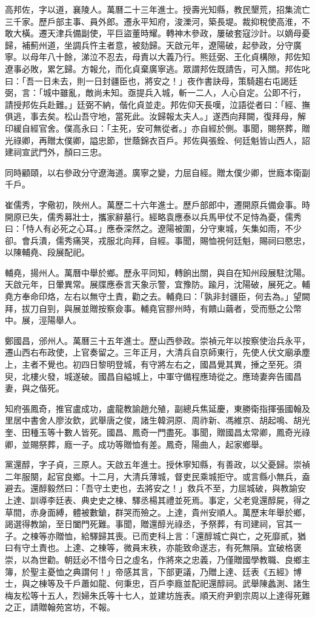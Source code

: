 \begin{pinyinscope}
高邦佐，字以道，襄陵人。萬曆二十三年進士。授壽光知縣，教民墾荒，招集流亡三千家。歷戶部主事、員外郎。遷永平知府，浚濼河，築長堤。裁抑稅使高淮，不敢大橫。遷天津兵備副使，平巨盜董時耀。轉神木參政，屢破套寇沙計。以嫡母憂歸，補薊州道，坐調兵忤主者意，被劾歸。天啟元年，遼陽破，起參政，分守廣寧。以母年八十餘，涕泣不忍去，母責以大義乃行。熊廷弼、王化貞構隙，邦佐知遼事必敗，累乞歸。方報允，而化貞棄廣寧逃。眾謂邦佐既請告，可入關。邦佐叱曰：「吾一日未去，則一日封疆臣也，將安之！」夜作書訣母，策騎趨右屯謁廷弼，言：「城中雖亂，敵尚未知。亟提兵入城，斬一二人，人心自定。公即不行，請授邦佐兵赴難。」廷弼不納，偕化貞並走。邦佐仰天長嘆，泣語從者曰：「經、撫俱逃，事去矣。松山吾守地，當死此。汝歸報太夫人。」遂西向拜闕，復拜母，解印緩自經官舍。僕高永曰：「主死，安可無從者。」亦自經於側。事聞，賜祭葬，贈光祿卿，再贈太僕卿，謚忠節，世蔭錦衣百戶。邦佐與張銓、何廷魁皆山西人，詔建祠宣武門外，顏曰三忠。

同時顧頤，以右參政分守遼海道。廣寧之變，力屈自經。贈太僕少卿，世廕本衛副千戶。

崔儒秀，字儆初，陜州人。萬歷二十六年進士。歷戶部郎中，遷開原兵備僉事。時開原已失，儒秀募壯士，攜家辭墓行。經略袁應泰以兵馬甲仗不足恃為憂，儒秀曰：「恃人有必死之心耳。」應泰深然之。遼陽被圍，分守東城，矢集如雨，不少卻。會兵潰，儒秀痛哭，戎服北向拜，自經。事聞，賜恤視何廷魁，賜祠曰愍忠，以陳輔堯、段展配祀。

輔堯，揚州人。萬曆中舉於鄉。歷永平同知，轉餉出關，與自在知州段展駐沈陽。天啟元年，日暈異常。展牒應泰言天象示警，宜豫防。踰月，沈陽破，展死之。輔堯方奉命印烙，左右以無守土責，勸之去。輔堯曰：「孰非封疆臣，何去為。」望闕拜，拔刀自剄，與展並贈按察僉事。輔堯官膠州時，有饋山繭者，受而懸之公幣中。展，涇陽舉人。

鄭國昌，邠州人。萬曆三十五年進士。歷山西參政。崇禎元年以按察使治兵永平，遷山西右布政使，上官奏留之。三年正月，大清兵自京師東行，先使人伏文廟承塵上，主者不覺也。初四日黎明登城，有守將左右之，國昌覺其異，捶之至死。須臾，北樓火發，城遂破。國昌自縊城上，中軍守備程應琦從之。應琦妻奔告國昌妻，與之偕死。

知府張鳳奇，推官盧成功，盧龍教諭趙允殖，副總兵焦延慶，東勝衛指揮張國翰及里居中書舍人廖汝欽，武舉唐之俊，諸生韓洞原、周祚新、馮維京、胡起鳴、胡光奎、田種玉等十數人皆死。國昌、鳳奇一門盡死。事聞，贈國昌太常卿，鳳奇光祿卿，並賜祭葬，廕一子。成功等贈恤有差。鳳奇，陽曲人，起家鄉舉。

黨還醇，字子貞，三原人。天啟五年進士。授休寧知縣，有善政，以父憂歸。崇禎二年服闋，起官良鄉。十二月，大清兵薄城，督吏民乘城拒守。或言縣小無兵，盍避去。還醇毅然曰：「吾守土吏也，去將安之！」救兵不至，力屈城破，與教諭安上達、訓導李廷表、典史史之棟、驛丞楊其禮並死焉。事定，父老覓還醇屍，得之草間，赤身面縛，體被數鎗，群哭而殮之。上達，貴州安順人。萬歷末年舉於鄉，謁選得教諭，至日闔門死難。事聞，贈還醇光祿丞，予祭葬，有司建祠，官其一子。之棟等亦贈恤，給驛歸其喪。已而吏科上言：「還醇城亡與亡，之死靡貳，猶曰有守土責也。上達、之棟等，微員末秩，亦能致命遂志，有死無隕。宜破格褒崇，以為世勸。朝廷必不惜今日之虛名，作將來之忠義，乃僅贈國學教職、良鄉主簿，於聖主憂恤之典謂何！」帝感其言，下部更議，乃贈上達、廷表《五經》博士，與之棟等及千戶蕭如龍、何秉忠，百戶李廕並配祀還醇祠。武舉陳蠡測、諸生梅友松等十五人，烈婦朱氏等十七人，並建坊旌表。順天府尹劉宗周以上達得死難之正，請贈翰苑宮坊，不報。


\end{pinyinscope}
